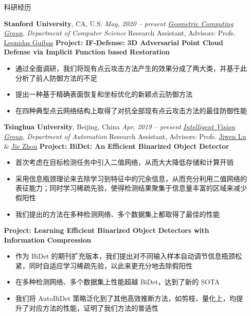 \documentclass{resume} %
\begin{document}
\begin{rSection}{科研经历}

{\textbf{Stanford University}, CA, U.S.} \hfill {\em May, 2020 -- present}\newline
\emph{\href{https://geometry.stanford.edu/}{Geometric Computing Group}, Department of Computer Science}\newline
Research Assistant, Advisors: Profs. \href{https://geometry.stanford.edu/member/guibas/index.html}{Leonidas Guibas}\newline
\textbf{Project: IF-Defense: 3D Adversarial Point Cloud Defense via Implicit Function based Restoration}
\begin{itemize}
    \item 通过全面调研，我们将现有点云攻击方法产生的效果分成了两大类，并基于此分析了前人防御方法的不足
    \item 提出一种基于精确表面恢复和坐标优化的新颖点云防御方法
    \item 在四种典型点云网络结构上取得了对抗全部现有点云攻击方法的最佳防御性能\newline
\end{itemize}

{\textbf{Tsinghua University}, Beijing, China} \hfill {\em Apr, 2019 -- present}\newline
\emph{\href{http://ivg.au.tsinghua.edu.cn/index.php}{Intelligent Vision Group}, Department of Automation}\newline
Research Assistant, Advisors: Profs. \href{http://ivg.au.tsinghua.edu.cn/Jiwen_Lu/}{Jiwen Lu} \& \href{https://www.tsinghua.edu.cn/publish/auen/1713/2011/20110506105532098625469/20110506105532098625469_.html}{Jie Zhou}\newline
\textbf{Project: BiDet: An Efficient Binarized Object Detector}
\begin{itemize}
    \item 首次考虑在目标检测任务中引入二值网络，从而大大降低存储和计算开销
    \item 采用信息瓶颈理论来去除学习到特征中的冗余信息，从而充分利用二值网络的表征能力；同时学习稀疏先验，使得检测结果聚集于信息量丰富的区域来减少假阳性
    \item 我们提出的方法在多种检测网络、多个数据集上都取得了最佳的性能\newline
\end{itemize}

\textbf{Project: Learning Efficient Binarized Object Detectors with Information Compression}
\begin{itemize}
    \item 作为 BiDet 的期刊扩充版本，我们提出对不同输入样本自动调节信息瓶颈松紧，同时自适应学习稀疏先验，以此来更充分地去除假阳性
    \item 在多种检测网络、多个数据集上性能超越 BiDet，达到了新的 SOTA
    \item 我们将 AutoBiDet 策略泛化到了其他高效推断方法，如剪枝、量化上，均提升了对应方法的性能，证明了我们方法的普适性\newline
\end{itemize}

\end{rSection}
\end{document}
